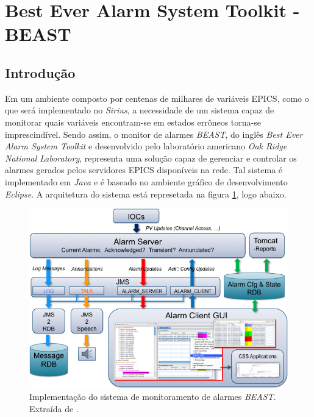 \section {Best Ever Alarm System Toolkit - BEAST}

\subsection {Introdução} \label{beast-intro}

Em um ambiente composto por centenas de milhares de variáveis EPICS, como o que
será implementado no \textit{Sirius}, a necessidade de um sistema capaz de
monitorar quais variáveis encontram-se em estados errôneos torna-se
imprescindível. Sendo assim, o monitor de alarmes \textit{BEAST}, do inglês
\textit{Best Ever Alarm System Toolkit} e desenvolvido pelo laboratório
americano \textit{Oak Ridge National Laboratory}, representa uma solução capaz
de gerenciar e controlar os alarmes gerados pelos servidores EPICS disponíveis
na rede. Tal sistema é implementado em \textit{Java} e é baseado no ambiente
gráfico de desenvolvimento \textit{Eclipse}. A arquitetura do sistema
está represetada na figura \ref{fig:best_arquitetura}, logo abaixo.

\begin{figure}[h]

\centering
\includegraphics[scale=0.40]{image/beast-arquitetura}
\caption {Implementação do sistema de monitoramento de alarmes
\textit{BEAST}. Extraída de \cite{beast}.}
\label{fig:best_arquitetura}
\end{figure}

\vspace{12pt}

